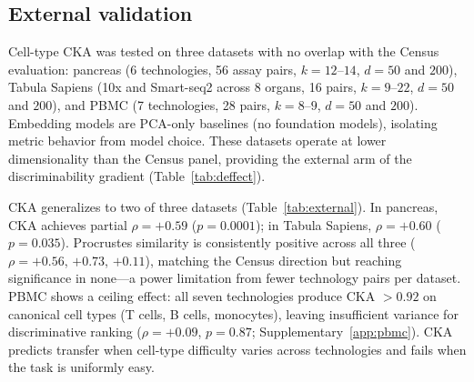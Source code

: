 \documentclass[11pt]{article}
\begin{document}
\subsection{External validation}
\label{sec:external}

Cell-type CKA was tested on three datasets with no overlap with the
Census evaluation: pancreas \citep{luecken2022scib} (6 technologies, 56
assay pairs, $k = 12$--$14$, $d = 50$ and $200$), Tabula Sapiens
\citep{tabulasapiens2022} (10x and Smart-seq2 across 8 organs, 16
pairs, $k = 9$--$22$, $d = 50$ and $200$), and PBMC
\citep{ding2020systematic} (7 technologies, 28 pairs, $k = 8$--$9$,
$d = 50$ and $200$). Embedding models are PCA-only baselines (no
foundation models), isolating metric behavior from model choice. These
datasets operate at lower dimensionality than the Census panel,
providing the external arm of the discriminability gradient
(Table~\ref{tab:deffect}).

CKA generalizes to two of three datasets
(Table~\ref{tab:external}). In pancreas, CKA achieves partial
$\rho = +0.59$ ($p = 0.0001$); in Tabula Sapiens, $\rho = +0.60$
($p = 0.035$). Procrustes similarity is consistently positive across all
three ($\rho = +0.56$, $+0.73$, $+0.11$), matching the Census direction
but reaching significance in none---a power limitation from fewer
technology pairs per dataset. PBMC shows a ceiling effect: all seven
technologies produce CKA $> 0.92$ on canonical cell types (T cells, B
cells, monocytes), leaving insufficient variance for discriminative
ranking ($\rho = +0.09$, $p = 0.87$; Supplementary~\ref{app:pbmc}). CKA
predicts transfer when cell-type difficulty varies across technologies
and fails when the task is uniformly easy.
\end{document}
